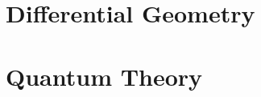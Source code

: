 \documentclass[12pt, a4paper]{report}
\begin{document}
% 
% 
% 
% 
% 
% 
% 

\part{Differential Geometry}\label{part:diffgeom}
% 
% 
% 
% 
% 
% 
% 

% 
% 
% 
% 
% 
% 
% 
% 

% 
% 
% 
% 
% 
% 
% 
% 

% 
% 
% 
% 

\part{Quantum Theory}
% 
% 

% 
% 
% 

% 
% 
% 
% 
\end{document}
